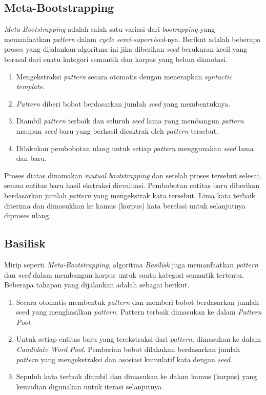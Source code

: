 \subsection{Meta-Bootstrapping}
\textit{Meta-Bootstrapping} adalah salah satu variasi dari \textit{bootrapping} yang memanfaatkan \textit{pattern} dalam \textit{cycle semi-supervised}-nya. Berikut adalah beberapa proses \citep{riloff1999learning} yang dijalankan algoritma ini jika diberikan \textit{seed} berukuran kecil yang berasal dari suatu kategori semantik dan korpus yang belum dianotasi.
\begin{enumerate}
  \item Mengekstraksi \textit{pattern} secara otomatis dengan menerapkan \textit{syntactic template}.
  \item \textit{Pattern} diberi bobot berdasarkan jumlah \textit{seed} yang membentuknya.
  \item Diambil \textit{pattern} terbaik dan seluruh \textit{seed} lama yang membangun \textit{pattern} maupun \textit{seed} baru yang berhasil diesktrak oleh \textit{pattern} tersebut.
  \item Dilakukan pembobotan ulang untuk setiap \textit{pattern} menggunakan \textit{seed} lama dan baru.
\end{enumerate}

Proses diatas dinamakan \textit{mutual bootstrapping} dan setelah proses tersebut selesai, semua entitas baru hasil ekstraksi dievaluasi. Pembobotan entitas baru diberikan berdasarkan jumlah \textit{pattern} yang mengekstrak kata tersebut. Lima kata terbaik diterima dan dimasukkan ke kamus (korpus) kata berelasi untuk selanjutnya diproses ulang.

\subsection{Basilisk}
Mirip seperti \textit{Meta-Bootstrapping}, algoritma \textit{Basilisk} \citep{thelen2002bootstrapping} juga memanfaatkan \textit{pattern} dan \textit{seed} dalam membangun korpus untuk suatu kategori semantik tertentu. Beberapa tahapan yang dijalankan adalah sebagai berikut.
\begin{enumerate}
  \item Secara otomatis membentuk \textit{pattern} dan memberi bobot berdasarkan jumlah seed yang menghasilkan \textit{pattern}. Pattern terbaik dimasukan ke dalam \textit{Pattern Pool}.
  \item Untuk setiap entitas baru yang terekstraksi dari \textit{pattern}, dimasukan ke dalam \textit{Candidate Word Pool}. Pemberian bobot dilakukan berdasarkan jumlah \textit{pattern} yang mengekstraksi dan asosiasi kumulatif kata dengan \textit{seed}.
  \item Sepuluh kata terbaik diambil dan dimasukan ke dalam kamus (korpus) yang kemudian digunakan untuk iterasi selanjutnya. 
\end{enumerate}

